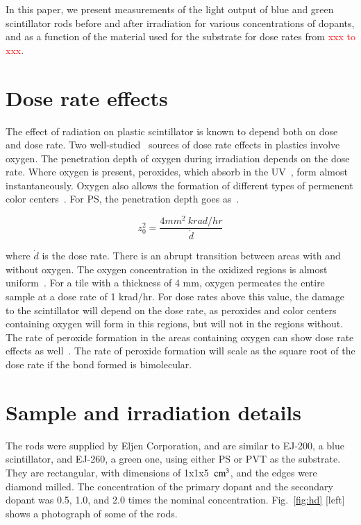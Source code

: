 \documentclass[review]{elsarticle}
\begin{document}
In this paper, we present measurements of the light output 
of blue and green scintillator rods 
before and after irradiation for various concentrations of dopants, and
as a function of the material used for the substrate
for dose rates from \textcolor{red}{xxx to xxx}.


\section{Dose rate effects}

The effect of radiation on plastic scintillator is known to depend
both on dose and dose rate.
Two well-studied~\cite{sauli,34504,Wick1991472,289295,173180,173178,Giokaris1993315,gillen,1748-0221-11-10-T10004,clough1,bolland1,bolland2,bateman,cunliffe,Biagtan1996125}
sources of dose rate effects in plastics
involve oxygen.   The penetration depth of oxygen
during irradiation depends on the dose rate.
Where oxygen is present, peroxides, which absorb in the UV~\cite{clough1},
form almost instantaneously.  Oxygen also allows the formation
of different types of permenent color centers~\cite{clough1}.
For PS, the penetration depth goes as~\cite{Wick1991472,cloughPS}.
\begin{linenomath}
\begin{equation}
z_0^2=\frac{4 mm^2~ krad/hr}{\dot{d}}
\label{eqn:z0}
\end{equation}
\end{linenomath}
where $\dot{d}$ is the dose rate.
There is an abrupt transition between areas with and without oxygen.  The
oxygen  concentration
in the oxidized regions is almost uniform~\cite{cloughPS}.
For a tile with a thickness of 4 mm, oxygen permeates the entire sample at
a dose rate of 1 krad/hr.
For dose rates above this value, the damage to the scintillator
will depend on the dose rate, as peroxides and color centers containing oxygen will
form in this regions,
but will not in the regions without.
The rate of peroxide
formation in the areas containing oxygen can show dose rate effects as well~\cite{clough1}.
The rate of peroxide formation will scale as the
square root of  the dose rate if the bond formed is bimolecular.


\section{Sample and irradiation details}
The rods were supplied by Eljen Corporation, and
are similar to EJ-200, a blue scintillator, and EJ-260, a green one, using either
PS or PVT as the substrate.
They are rectangular, with dimensions of 1x1x5~$\rm{cm^3}$, 
and the edges were diamond milled.
The concentration of the primary dopant and the secondary dopant
was 0.5, 1.0, and 2.0 times the nominal concentration.
Fig.~\ref{fig:hd} [left] shows a photograph of some of the rods.
\end{document}

